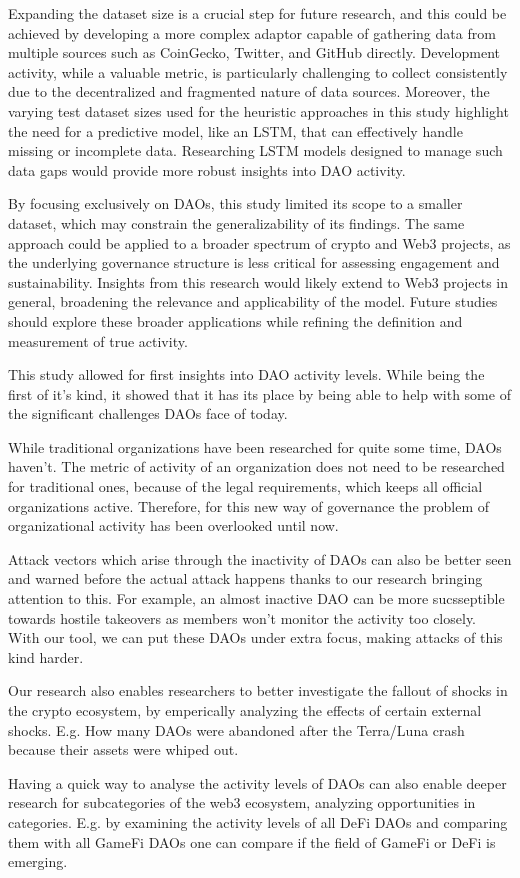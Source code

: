 Expanding the dataset size is a crucial step for future research, and this could be achieved by developing a more complex adaptor capable of gathering data from multiple sources such as CoinGecko, Twitter, and GitHub directly. Development activity, while a valuable metric, is particularly challenging to collect consistently due to the decentralized and fragmented nature of data sources. Moreover, the varying test dataset sizes used for the heuristic approaches in this study highlight the need for a predictive model, like an LSTM, that can effectively handle missing or incomplete data. Researching LSTM models designed to manage such data gaps would provide more robust insights into DAO activity.


By focusing exclusively on DAOs, this study limited its scope to a smaller dataset, which may constrain the generalizability of its findings. The same approach could be applied to a broader spectrum of crypto and Web3 projects, as the underlying governance structure is less critical for assessing engagement and sustainability. Insights from this research would likely extend to Web3 projects in general, broadening the relevance and applicability of the model. Future studies should explore these broader applications while refining the definition and measurement of true activity.









This study allowed for first insights into DAO activity levels. While being the first of it's kind, it showed that it has its place by being able to help with some of the significant challenges DAOs face of today.

While traditional organizations have been researched for quite some time, DAOs haven't. The metric of activity of an organization does not need to be researched for traditional ones, because of the legal requirements, which keeps all official organizations active. Therefore, for this new way of governance the problem of organizational activity has been overlooked until now.

Attack vectors which arise through the inactivity of DAOs can also be better seen and warned before the actual attack happens thanks to our research bringing attention to this. For example, an almost inactive DAO can be more sucsseptible towards hostile takeovers as members won't monitor the activity too closely. With our tool, we can put these DAOs under extra focus, making attacks of this kind harder.

Our research also enables researchers to better investigate the fallout of shocks in the crypto ecosystem, by emperically analyzing the effects of certain external shocks. E.g. How many DAOs were abandoned after the Terra/Luna crash because their assets were whiped out.

Having a quick way to analyse the activity levels of DAOs can also enable deeper research for subcategories of the web3 ecosystem, analyzing opportunities in categories. E.g. by examining the activity levels of all DeFi DAOs and comparing them with all GameFi DAOs one can compare if the field of GameFi or DeFi is emerging.

